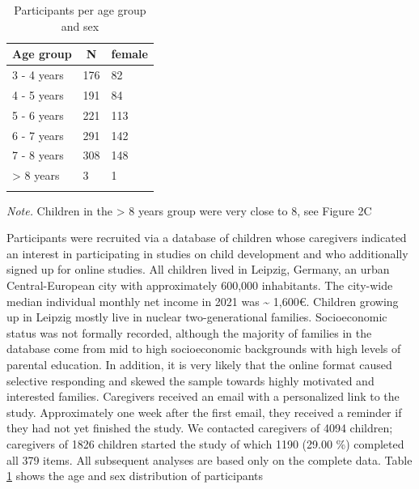 \documentclass[
  man,floatsintext]{apa6}
\begin{document}
\begin{table}[tbp]

\begin{center}
\begin{threeparttable}

\caption{\label{tab:tab1}Participants per age group and sex}

\begin{tabular}{lll}
\toprule
Age group & \multicolumn{1}{c}{N} & \multicolumn{1}{c}{female}\\
\midrule
3 - 4 years & 176 & 82\\
4 - 5 years & 191 & 84\\
5 - 6 years & 221 & 113\\
6 - 7 years & 291 & 142\\
7 - 8 years & 308 & 148\\
> 8 years & 3 & 1\\
\bottomrule
\addlinespace
\end{tabular}

\begin{tablenotes}[para]
\normalsize{\textit{Note.} Children in the > 8 years group were very close to 8, see Figure 2C}
\end{tablenotes}

\end{threeparttable}
\end{center}

\end{table}

Participants were recruited via a database of children whose caregivers indicated an interest in participating in studies on child development and who additionally signed up for online studies. All children lived in Leipzig, Germany, an urban Central-European city with approximately 600,000 inhabitants. The city-wide median individual monthly net income in 2021 was \textasciitilde{} 1,600€. Children growing up in Leipzig mostly live in nuclear two-generational families. Socioeconomic status was not formally recorded, although the majority of families in the database come from mid to high socioeconomic backgrounds with high levels of parental education. In addition, it is very likely that the online format caused selective responding and skewed the sample towards highly motivated and interested families. Caregivers received an email with a personalized link to the study. Approximately one week after the first email, they received a reminder if they had not yet finished the study. We contacted caregivers of 4094 children; caregivers of 1826 children started the study of which 1190 (29.00 \%) completed all 379 items. All subsequent analyses are based only on the complete data. Table \ref{tab:tab1} shows the age and sex distribution of participants
\end{document}
